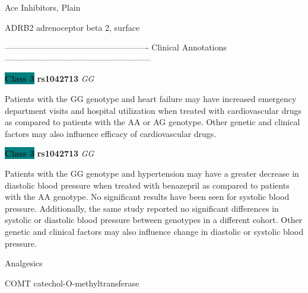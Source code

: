 \documentclass{resume} %
\begin{document}
\begin{rSection}{ Ace Inhibitors, Plain }
\item[]

\begin{rSubsection}{ ADRB2 }{ adrenoceptor beta 2, surface }{}{}
\item[]

\item[] ---------------------------------------------------- Clinical Annotations -----------------------------------------------------\newline
\item \textbf{\colorbox{teal} {Class 3}} \textbf{ rs1042713 } \textit{ GG }
\item[] Patients with the GG genotype and heart failure may have increased emergency department visits and hospital utilization when treated with cardiovascular drugs as compared to patients with the AA or AG genotype. Other genetic and clinical factors may also influence efficacy of cardiovascular drugs.\item \textbf{\colorbox{teal} {Class 3}} \textbf{ rs1042713 } \textit{ GG }
\item[] Patients with the GG genotype and hypertension may have a greater decrease in diastolic blood pressure when treated with benazepril as compared to patients with the AA genotype. No significant results have been seen for systolic blood pressure. Additionally, the same study reported no significant differences in systolic or diastolic blood pressure between genotypes in a different cohort. Other genetic and clinical factors may also influence change in diastolic or systolic blood pressure.
\end{rSubsection}

\end{rSection}\begin{rSection}{ Analgesics }
\item[]

\begin{rSubsection}{ COMT }{ catechol-O-methyltransferase }{}{}
\item[]


\end{rSubsection}
\end{rSection}
\end{document}

